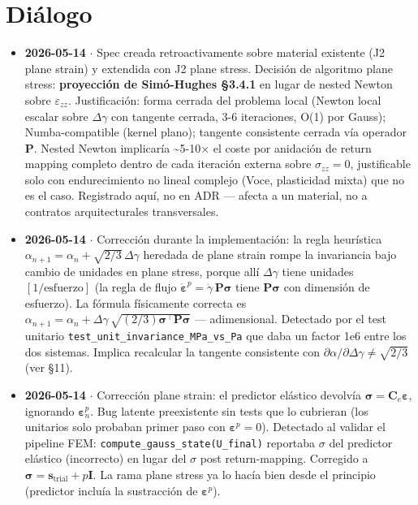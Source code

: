 \documentclass[11pt,letterpaper,oneside]{report}
\begin{document}
\section{Diálogo}

\begin{itemize}
  \item \textbf{2026-05-14} \ensuremath{\cdot} Spec creada retroactivamente sobre material existente (J2 plane strain) y extendida con J2 plane stress. Decisión de algoritmo plane stress: \textbf{proyección de Simó-Hughes §3.4.1} en lugar de nested Newton sobre $\varepsilon_{zz}$. Justificación: forma cerrada del problema local (Newton local escalar sobre $\Delta\gamma$ con tangente cerrada, 3-6 iteraciones, O(1) por Gauss); Numba-compatible (kernel plano); tangente consistente cerrada vía operador $\mathbf P$. Nested Newton implicaría \textasciitilde{}5-10\ensuremath{\times} el coste por anidación de return mapping completo dentro de cada iteración externa sobre $\sigma_{zz}=0$, justificable solo con endurecimiento no lineal complejo (Voce, plasticidad mixta) que no es el caso. Registrado aquí, no en ADR --- afecta a un material, no a contratos arquitecturales transversales.
  \item \textbf{2026-05-14} \ensuremath{\cdot} Corrección durante la implementación: la regla heurística $\alpha_{n+1} = \alpha_n + \sqrt{2/3}\,\Delta\gamma$ heredada de plane strain rompe la invariancia bajo cambio de unidades en plane stress, porque allí $\Delta\gamma$ tiene unidades $[1/\text{esfuerzo}]$ (la regla de flujo $\dot{\boldsymbol\varepsilon}^p = \dot\gamma\,\mathbf P\boldsymbol\sigma$ tiene $\mathbf P\boldsymbol\sigma$ con dimensión de esfuerzo). La fórmula físicamente correcta es $\alpha_{n+1} = \alpha_n + \Delta\gamma\,\sqrt{(2/3)\boldsymbol\sigma^\top\mathbf P\boldsymbol\sigma}$ --- adimensional. Detectado por el test unitario \texttt{test\_unit\_invariance\_MPa\_vs\_Pa} que daba un factor 1e6 entre los dos sistemas. Implica recalcular la tangente consistente con $\partial\alpha/\partial\Delta\gamma \neq \sqrt{2/3}$ (ver §11).
  \item \textbf{2026-05-14} \ensuremath{\cdot} Corrección plane strain: el predictor elástico devolvía $\boldsymbol\sigma = \mathbf C_e\boldsymbol\varepsilon$, ignorando $\boldsymbol\varepsilon^p_n$. Bug latente preexistente sin tests que lo cubrieran (los unitarios solo probaban primer paso con $\boldsymbol\varepsilon^p = 0$). Detectado al validar el pipeline FEM: \texttt{compute\_gauss\_state(U\_final)} reportaba \ensuremath{\sigma} del predictor elástico (incorrecto) en lugar del \ensuremath{\sigma} post return-mapping. Corregido a $\boldsymbol\sigma = \mathbf s_\text{trial} + p\mathbf I$. La rama plane stress ya lo hacía bien desde el principio (predictor incluía la sustracción de $\boldsymbol\varepsilon^p$).

\end{itemize}
\end{document}
